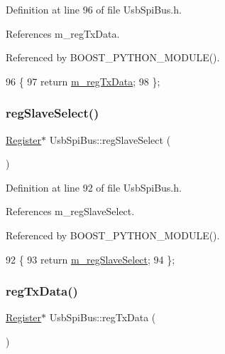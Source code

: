 Definition at line 96 of file Usb\+Spi\+Bus.\+h.



References m\+\_\+reg\+Tx\+Data.



Referenced by B\+O\+O\+S\+T\+\_\+\+P\+Y\+T\+H\+O\+N\+\_\+\+M\+O\+D\+U\+L\+E().


\begin{DoxyCode}
96                         \{
97     \textcolor{keywordflow}{return} \hyperlink{classUsbSpiBus_ae4b9ec4d035b9a507735b28dba04556c}{m\_regTxData};
98   \};
\end{DoxyCode}
\mbox{\label{classUsbSpiBus_a9bc70ad9842d8aa8f89b24599bfd6238}} 
\subsubsection{\texorpdfstring{reg\+Slave\+Select()}{regSlaveSelect()}}
{\footnotesize\ttfamily \hyperlink{classRegister}{Register}$\ast$ Usb\+Spi\+Bus\+::reg\+Slave\+Select (\begin{DoxyParamCaption}{ }\end{DoxyParamCaption})\hspace{0.3cm}{\ttfamily [inline]}}



Definition at line 92 of file Usb\+Spi\+Bus.\+h.



References m\+\_\+reg\+Slave\+Select.



Referenced by B\+O\+O\+S\+T\+\_\+\+P\+Y\+T\+H\+O\+N\+\_\+\+M\+O\+D\+U\+L\+E().


\begin{DoxyCode}
92                              \{
93     \textcolor{keywordflow}{return} \hyperlink{classUsbSpiBus_a5cdebdc06a79322c0802fbc523cade91}{m\_regSlaveSelect};
94   \};
\end{DoxyCode}
\mbox{\label{classUsbSpiBus_ab8044b2af7209f9eb37c0a96e3e28637}} 
\subsubsection{\texorpdfstring{reg\+Tx\+Data()}{regTxData()}}
{\footnotesize\ttfamily \hyperlink{classRegister}{Register}$\ast$ Usb\+Spi\+Bus\+::reg\+Tx\+Data (\begin{DoxyParamCaption}{ }\end{DoxyParamCaption})\hspace{0.3cm}{\ttfamily [inline]}}



